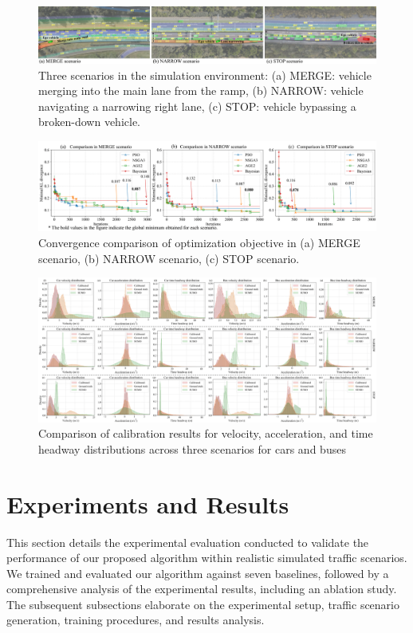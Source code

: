 \begin{figure}[htbp]
    \centering
    \includegraphics[width=\textwidth]{fig/sim.png}
    \caption{Three scenarios in the simulation environment: (a) MERGE: vehicle merging into the main lane from the ramp, (b) NARROW: vehicle navigating a narrowing right lane, (c) STOP: vehicle bypassing a broken-down vehicle.}
    \label{fig:sim}
\end{figure}
\begin{figure}[!htbp]
    \centering
    \includegraphics[width=\textwidth]{fig/env_iter.png}
    \caption{
        Convergence comparison of optimization objective in (a) MERGE scenario, (b) NARROW scenario, (c) STOP scenario. 
    }
    \label{fig:env_iter}
\end{figure}

\begin{figure}[!htbp]
    \centering
    \includegraphics[width=\textwidth]{fig/env_dis.png}
    \caption{Comparison of calibration results for velocity, acceleration, and time headway distributions across three scenarios for cars and buses}
    \label{fig:env_distri}
\end{figure}


\section{Experiments and Results}
\label{sec:experiments}
This section details the experimental evaluation conducted to validate the performance of our proposed algorithm within realistic simulated traffic scenarios. We trained and evaluated our algorithm against seven baselines, followed by a comprehensive analysis of the experimental results, including an ablation study. The subsequent subsections elaborate on the experimental setup, traffic scenario generation, training procedures, and results analysis.

